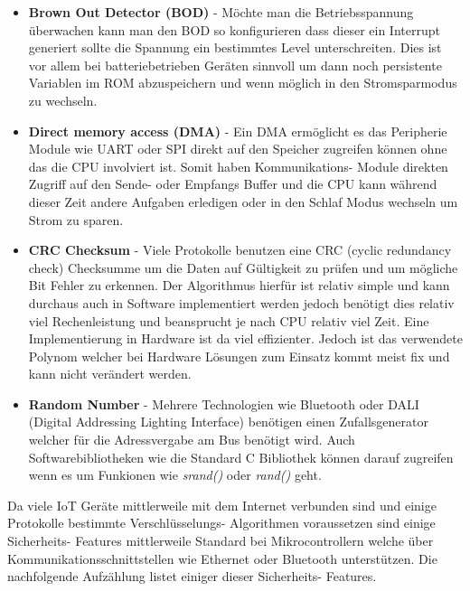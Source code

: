 \documentclass[MES,Master,ngerman]{twbook}%
\begin{document}
\begin{itemize}
	\item \textbf{Brown Out Detector (BOD)} - Möchte man die Betriebsspannung überwachen kann man den BOD so konfigurieren dass dieser ein Interrupt generiert sollte die Spannung ein bestimmtes Level unterschreiten. Dies ist vor allem bei batteriebetrieben Geräten sinnvoll um dann noch persistente Variablen im ROM abzuspeichern und wenn möglich in den Stromsparmodus zu wechseln.
	\item \textbf{Direct memory access (DMA)} - Ein DMA ermöglicht es das Peripherie Module wie UART oder SPI direkt auf den Speicher zugreifen können ohne das die CPU involviert ist. Somit haben Kommunikations- Module direkten Zugriff auf den Sende- oder Empfangs Buffer und die CPU kann während dieser Zeit andere Aufgaben erledigen oder in den Schlaf Modus wechseln um Strom zu sparen.
	\item \textbf{CRC Checksum} - Viele Protokolle benutzen eine CRC (cyclic redundancy check) Checksumme um die Daten auf Gültigkeit zu prüfen und um mögliche Bit Fehler zu erkennen. Der Algorithmus hierfür ist relativ simple und kann durchaus auch in Software implementiert werden jedoch benötigt dies relativ viel Rechenleistung und beansprucht je nach CPU relativ viel Zeit. Eine Implementierung in Hardware ist da viel effizienter. Jedoch ist das verwendete Polynom welcher bei Hardware Lösungen zum Einsatz kommt meist fix und kann nicht verändert werden.  
	\item \textbf{Random Number} - Mehrere Technologien wie Bluetooth oder DALI (Digital Addressing Lighting Interface) benötigen einen Zufallsgenerator welcher für die Adressvergabe am Bus benötigt wird.  Auch Softwarebibliotheken wie die Standard C Bibliothek können darauf zugreifen wenn es um Funkionen wie \textit{srand()} oder \textit{rand()} geht.
\end{itemize}

Da viele IoT Geräte mittlerweile mit dem Internet verbunden sind und einige Protokolle bestimmte Verschlüsselungs- Algorithmen voraussetzen sind einige Sicherheits- Features mittlerweile Standard bei Mikrocontrollern welche über Kommunikationsschnittstellen wie Ethernet oder Bluetooth unterstützen. Die nachfolgende Aufzählung listet einiger dieser Sicherheits- Features.
\end{document}
